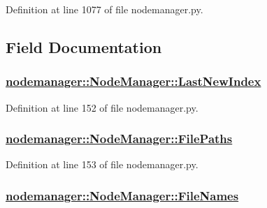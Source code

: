Definition at line 1077 of file nodemanager.py.

\subsection{Field Documentation}
\hypertarget{classnodemanager_1_1NodeManager_6f4b2b8bfaad8695971d7b3fbde3d24c}{
\subsubsection[LastNewIndex]{\setlength{\rightskip}{0pt plus 5cm}\hyperlink{classnodemanager_1_1NodeManager_6f4b2b8bfaad8695971d7b3fbde3d24c}{nodemanager::Node\-Manager::Last\-New\-Index}}}
\label{classnodemanager_1_1NodeManager_6f4b2b8bfaad8695971d7b3fbde3d24c}




Definition at line 152 of file nodemanager.py.\hypertarget{classnodemanager_1_1NodeManager_41b876781b15d80c22373f32b7efa3e4}{
\subsubsection[FilePaths]{\setlength{\rightskip}{0pt plus 5cm}\hyperlink{classnodemanager_1_1NodeManager_41b876781b15d80c22373f32b7efa3e4}{nodemanager::Node\-Manager::File\-Paths}}}
\label{classnodemanager_1_1NodeManager_41b876781b15d80c22373f32b7efa3e4}




Definition at line 153 of file nodemanager.py.\hypertarget{classnodemanager_1_1NodeManager_d5be2d321e10ab74d8d163580fae5007}{
\subsubsection[FileNames]{\setlength{\rightskip}{0pt plus 5cm}\hyperlink{classnodemanager_1_1NodeManager_d5be2d321e10ab74d8d163580fae5007}{nodemanager::Node\-Manager::File\-Names}}}
\label{classnodemanager_1_1NodeManager_d5be2d321e10ab74d8d163580fae5007}




